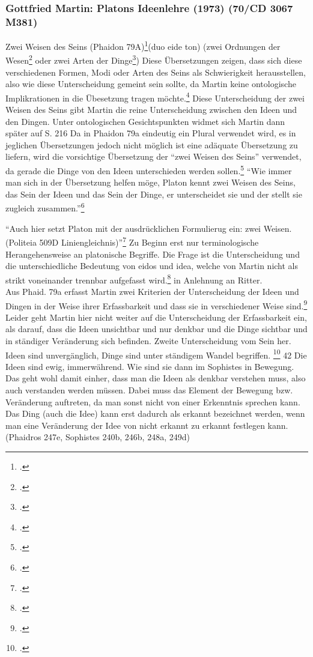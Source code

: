 \subsubsection*{Gottfried Martin: Platons Ideenlehre (1973) (70/CD 3067 M381)}
Zwei Weisen des Seins (Phaidon 79A)\footcite[vgl.][S. 37]{Martin73}(duo eide ton) (zwei Ordnungen der Wesen\footcite[][S. 43]{PhaidonKassner} oder zwei Arten der Dinge\footcite[][S. 247]{PhaidonSchleiermacher})
Diese Übersetzungen zeigen, dass sich diese verschiedenen Formen, Modi oder Arten des Seins als Schwierigkeit herausstellen, also wie diese Unterscheidung gemeint sein sollte, da Martin keine ontologische Implikrationen in die Übesetzung tragen möchte.\footcite[vgl.][S. 37]{Martin73} Diese Unterscheidung der zwei Weisen des Seins gibt Martin die reine Unterscheidung zwischen den Ideen und den Dingen.
Unter ontologischen Gesichtspunkten widmet sich Martin dann später auf S. 216
Da in Phaidon 79a eindeutig ein Plural verwendet wird, es in jeglichen Übersetzungen jedoch nicht möglich ist eine adäquate Übersetzung zu liefern, wird die vorsichtige Übersetzung der \enquote{zwei Weisen des Seins} verwendet, da gerade die Dinge von den Ideen unterschieden werden sollen.\footcite[vgl.][S. 216]{Martin73} \enquote{Wie immer man sich in der Übersetzung helfen möge, Platon kennt zwei Weisen des Seins, das Sein der Ideen und das Sein der Dinge, er unterscheidet sie und der stellt sie zugleich zusammen.}\footcite[][S. 216]{Martin73}

\enquote{Auch hier setzt Platon mit der ausdrücklichen Formulierug ein: zwei Weisen. (Politeia 509D Liniengleichnis)}\footcite[][S. 39]{Martin73}
Zu Beginn erst nur terminologische Herangehensweise an platonische Begriffe.
Die Frage ist die Unterscheidung und die unterschiedliche Bedeutung von eidos und idea, welche von Martin nicht als strikt voneinander trennbar aufgefasst wird.\footcite[vgl.][S. 39]{Martin73} in Anlehnung an Ritter.\\
Aus Phaid. 79a erfasst Martin zwei Kriterien der Unterscheidung der Ideen und Dingen in der Weise ihrer Erfassbarkeit und dass sie in verschiedener Weise sind.\footcite[vgl.][S. 40]{Martin73}
Leider geht Martin hier nicht weiter auf die Unterscheidung der Erfassbarkeit ein, als darauf, dass die Ideen unsichtbar und nur denkbar und die Dinge sichtbar und in ständiger Veränderung sich befinden. 
Zweite Unterscheidung vom Sein her. Ideen sind unvergänglich, Dinge sind unter ständigem Wandel begriffen. \footcite[vgl.][S. 41]{Martin73}
42 Die Ideen sind ewig, immerwährend. Wie sind sie dann im Sophistes in Bewegung. Das geht wohl damit einher, dass man die Ideen als denkbar verstehen muss, also auch verstanden werden müssen. Dabei muss das Element der Bewegung bzw. Veränderung auftreten, da man sonst nicht von einer Erkenntnis sprechen kann. Das Ding (auch die Idee) kann erst dadurch als erkannt bezeichnet werden, wenn man eine Veränderung der Idee von nicht erkannt zu erkannt festlegen kann. (Phaidros 247e, Sophistes 240b, 246b, 248a, 249d)

